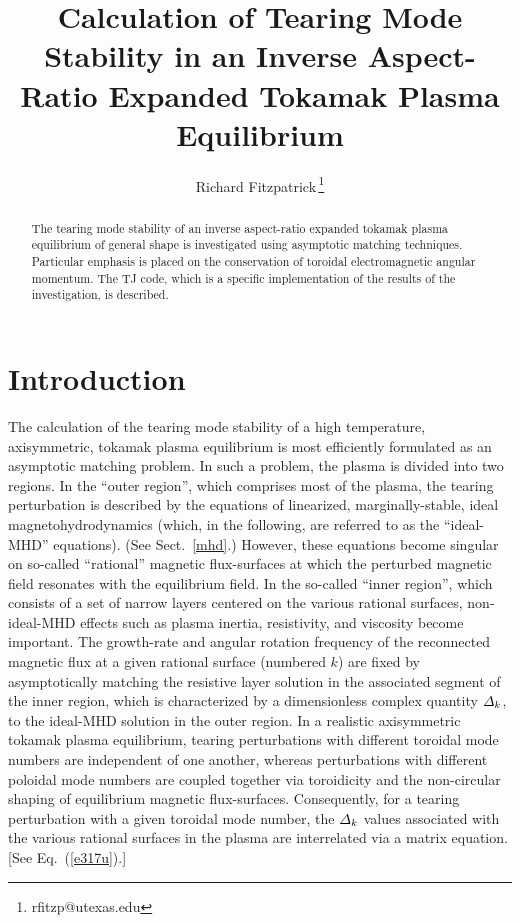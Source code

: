 \documentclass[12pt,prb,aps]{revtex4-1}
\begin{document}
\title{Calculation of Tearing Mode Stability in an Inverse Aspect-Ratio Expanded Tokamak Plasma Equilibrium}
\author{Richard Fitzpatrick\,\footnote{rfitzp@utexas.edu}}

\begin{abstract}
The   tearing mode stability of an inverse aspect-ratio expanded tokamak plasma equilibrium of general
shape  is investigated using asymptotic matching techniques. Particular emphasis is placed on the
conservation of toroidal electromagnetic angular momentum. The TJ code, which is a specific implementation of the
results of the investigation, is described. 
\end{abstract}
\maketitle

\section{Introduction} 
The calculation of the tearing mode stability of a high temperature, axisymmetric,  tokamak plasma equilibrium is most efficiently formulated as  an asymptotic
matching problem.\cite{fkr} In such a problem, the  plasma is  divided into two regions. In the ``outer region'', which comprises most
of the plasma, the tearing perturbation is described by the equations of linearized, marginally-stable, ideal magnetohydrodynamics (which, in the following, are
referred to as the ``ideal-MHD'' equations). (See Sect.~\ref{mhd}.)
However, these equations become singular on so-called ``rational'' magnetic flux-surfaces at which the perturbed magnetic field resonates with the equilibrium field. In the so-called ``inner region'', which
consists of a set of narrow layers centered on the various rational surfaces, non-ideal-MHD effects such as plasma inertia, resistivity, and
viscosity become important. The growth-rate and angular rotation frequency of the reconnected magnetic flux at a given rational
surface (numbered $k$) are fixed by asymptotically matching the resistive layer
solution in the associated segment of the inner region, which is characterized by a dimensionless complex quantity ${\mit\Delta}_k$,  to the ideal-MHD solution in the outer region. In a realistic axisymmetric tokamak  plasma equilibrium, tearing
perturbations with different toroidal mode numbers are independent of one another, whereas perturbations with different poloidal
mode numbers are coupled together via toroidicity and the non-circular shaping of equilibrium magnetic flux-surfaces.\cite{con0}
Consequently, for a tearing perturbation with a given toroidal mode number, 
 the ${\mit\Delta}_k$ values associated with  the various rational surfaces in the plasma are interrelated via a matrix equation.\cite{cht} [See Eq.~(\ref{e317u}).]
\end{document}
